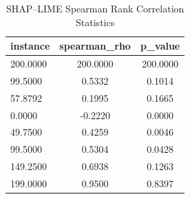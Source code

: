 \begin{table}
\centering
\caption{SHAP–LIME Spearman Rank Correlation Statistics}
\label{tab:agreement}
\begin{tabular}{lcc}
\toprule
instance & spearman_rho & p_value \\
\midrule
200.0000 & 200.0000 & 200.0000 \\
99.5000 & 0.5332 & 0.1014 \\
57.8792 & 0.1995 & 0.1665 \\
0.0000 & -0.2220 & 0.0000 \\
49.7500 & 0.4259 & 0.0046 \\
99.5000 & 0.5304 & 0.0428 \\
149.2500 & 0.6938 & 0.1263 \\
199.0000 & 0.9500 & 0.8397 \\
\bottomrule
\end{tabular}
\end{table}
